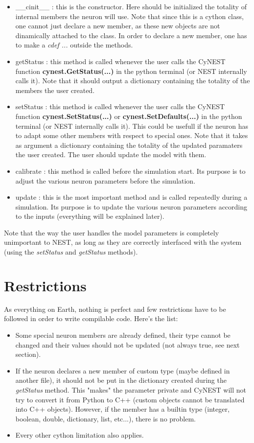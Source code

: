 \documentclass{article}
\begin{document}
\begin{itemize}
\item \_\_cinit\_\_ : this is the constructor. Here should be initialized the totality of internal members the neuron will use. Note that since this is a cython class, one cannot just declare a new member, as these new objects are not dinamically attached to the class. In order to declare a new member, one has to make a \emph{cdef ...} outside the methods. 
\item getStatus : this method is called whenever the user calls the CyNEST function \textbf{ cynest.GetStatus(...)} in the python terminal (or NEST internally calls it). Note that it should output a dictionary containing the totality of the members the user created.
\item setStatus : this method is called whenever the user calls the CyNEST function \textbf{ cynest.SetStatus(...)} or \textbf{cynest.SetDefaults(...)} in the python terminal (or NEST internally calls it). This could be usefull if the neuron has to adapt some other members with respect to special ones. Note that it takes as argument a dictionary containing the totality of the updated paramaters the user created. The user should update the model with them.
\item calibrate : this method is called before the simulation start. Its purpose is to adjust the various neuron parameters before the simulation.
\item update : this is the most important method and is called repeatedly during a simulation. Its purpose is to update the various neuron parameters according to the inputs (everything will be explained later).
\end{itemize}
Note that the way the user handles the model parameters is completely unimportant to NEST, as long as they are correctly interfaced with the system (using the \emph{setStatus} and \emph{getStatus} methods).


\section{Restrictions}
As everything on Earth, nothing is perfect and few restrictions have to be followed in order to write compilable code. Here's the list:
\begin{itemize}
\item Some special neuron members are already defined, their type cannot be changed and their values should not be updated (not always true, see next section).
\item If the neuron declares a new member of custom type (maybe defined in another file), it should not be put in the dictionary created during the \emph{getStatus} method. This "makes" the parameter private and CyNEST will not try to convert it from Python to C++ (custom objects cannot be translated into C++ objects). However, if the member has a builtin type (integer, boolean, double, dictionary, list, etc...), there is no problem.
\item Every other cython limitation also applies.
\end{itemize}
\end{document}
